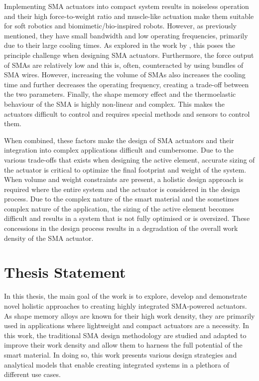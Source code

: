 Implementing SMA actuators into compact system results in noiseless operation and their high force-to-weight ratio and muscle-like actuation make them suitable for soft robotics and biomimetic/bio-inspired robots. However, as previously mentioned, they have small bandwidth and low operating frequencies, primarily due to their large cooling times. As explored in the work by \cite{sootherChallengesPracticalApplications2020}, this poses the principle challenge when designing SMA actuators. Furthermore, the force output of SMAs are relatively low and this is, often, counteracted by using bundles of SMA wires. However, increasing the volume of SMAs also increases the cooling time and further decreases the operating frequency, creating a trade-off between the two parameters. Finally, the shape memory effect and the thermoelastic behaviour of the SMA is highly non-linear and complex. This makes the actuators difficult to control and requires special methods and sensors to control them.

When combined, these factors make the design of SMA actuators and their integration into complex applications difficult and cumbersome. Due to the various trade-offs that exists when designing the active element, accurate sizing of the actuator is critical to optimize the final footprint and weight of the system. When volume and weight constraints are present, a holistic design approach is required where the entire system and the actuator is considered in the design process. Due to the complex nature of the smart material and the sometimes complex nature of the application, the sizing of the active element becomes difficult and results in a system that is not fully optimised or is oversized. These concessions in the design process results in a degradation of the overall work density of the SMA actuator.

\section*{Thesis Statement}
In this thesis, the main goal of the work is to explore, develop and demonstrate novel holistic approaches to creating highly integrated SMA-powered actuators. As shape memory alloys are known for their high work density, they are primarily used in applications where lightweight and compact actuators are a necessity. In this work, the traditional SMA design methodology are studied and adapted to improve their work density and allow them to harness the full potential of the smart material. In doing so, this work presents various design strategies and analytical models that enable creating integrated systems in a plethora of different use cases.

